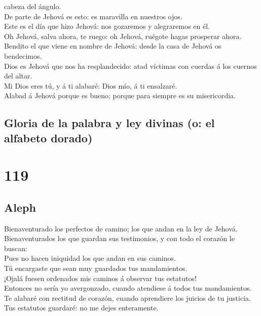cabeza del ángulo.\\
 De parte de Jehová es esto: es maravilla en nuestros
ojos.\\
 Este es el día que hizo Jehová: nos gozaremos y
alegraremos en él.\\
 Oh Jehová, salva ahora, te ruego: oh Jehová, ruégote hagas
prosperar ahora.\\
 Bendito el que viene en nombre de Jehová: desde la casa de
Jehová os bendecimos.\\
 Dios es Jehová que nos ha resplandecido: atad víctimas con
cuerdas á los cuernos del altar.\\
 Mi Dios eres tú, y á ti alabaré: Dios mío, á ti
ensalzaré.\\
 Alabad á Jehová porque es bueno; porque para siempre es su
misericordia.

\hypertarget{gloria-de-la-palabra-y-ley-divinas-o-el-alfabeto-dorado}{%
\subsection{Gloria de la palabra y ley divinas (o: el alfabeto
dorado)}\label{gloria-de-la-palabra-y-ley-divinas-o-el-alfabeto-dorado}}

\hypertarget{section-118}{%
\section{119}\label{section-118}}

\hypertarget{aleph}{%
\subsection{Aleph}\label{aleph}}

 Bienaventurado los perfectos de camino; los que andan en la
ley de Jehová.\\
 Bienaventurados los que guardan sus testimonios, y con todo
el corazón le buscan:\\
 Pues no hacen iniquidad los que andan en sus caminos.\\
 Tú encargaste que sean muy guardados tus mandamientos.\\
 ¡Ojalá fuesen ordenados mis caminos á observar tus
estatutos!\\
 Entonces no sería yo avergonzado, cuando atendiese á todos
tus mandamientos.\\
 Te alabaré con rectitud de corazón, cuando aprendiere los
juicios de tu justicia.\\
 Tus estatutos guardaré: no me dejes enteramente.

